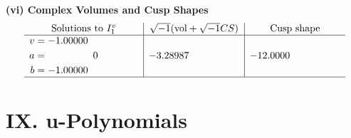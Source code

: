 \documentclass[1p]{elsarticle_modified}
\theoremstyle{definition}
\newcommand{\I}{\sqrt{-1}}
\begin{document}
\newpage\flushleft \textbf{(vi) Complex Volumes and Cusp Shapes}
$$\begin{array}{c|c|c}  
\text{Solutions to }I^v_{1}& \I (\text{vol} + \sqrt{-1}CS) & \text{Cusp shape}\\
 \hline 
\begin{aligned}
v &= -1.00000\phantom{ +0.000000I} \\
a &= \phantom{-0.000000 } 0 \\
b &= -1.00000\phantom{ +0.000000I}\end{aligned}
 & -3.28987\phantom{ +0.000000I} & -12.0000\phantom{ +0.000000I}\\
 \hline 
 \end{array}$$\newpage
\newpage\renewcommand{\arraystretch}{1}
\centering \section*{ IX. u-Polynomials}
\end{document}
